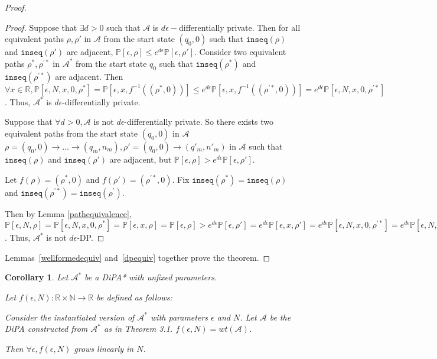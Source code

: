 \documentclass[12pt]{article}
\newcommand{\NN}{\mathbb{N}}
\newcommand{\RR}{\mathbb{R}}
\newcommand{\PP}{\mathbb{P}}
\newtheorem{cor}[thm]{Corollary}
\theoremstyle{definition}
\begin{document}
\begin{proof}
\begin{proof}
	Suppose that $\exists d > 0$ such that $\mathcal{A}$ is $d\epsilon-$differentially private. Then for all equivalent paths $\rho, \rho'$ in $\mathcal{A}$ from the start state $(q_0, 0)$ such that $\texttt{inseq}(\rho)$ and $\texttt{inseq}(\rho')$ are adjacent, $\PP[\epsilon, \rho] \leq e^{d\epsilon} \PP[\epsilon, \rho']$.
	Consider two equivalent paths $\rho^*, \rho^{\prime *}$ in $\mathcal{A}^*$ from the start state $q_0$ such that $\texttt{inseq}(\rho^*)$ and $\texttt{inseq}(\rho^{\prime *})$ are adjacent. Then $\forall x\in \RR, \PP[\epsilon, N, x, 0, \rho^*] = \PP[\epsilon, x, f^{-1}((\rho^*, 0))] \leq e^{d\epsilon}\PP[\epsilon, x, f^{-1}((\rho^{\prime *}, 0))] = e^{d\epsilon}\PP[\epsilon, N, x, 0, \rho^{\prime *}]$. Thus, $\mathcal{A}^*$ is $d\epsilon$-differentially private.

	Suppose that $\forall d>0, \mathcal{A}$ is not $d\epsilon$-differentially private. So there exists two equivalent paths from the start state $(q_0, 0)$ in $\mathcal{A}$ $\rho = (q_0, 0)\to\ldots\to (q_m, n_m), \rho' = (q_0, 0) \to (q'_m, n'_m)$ in $\mathcal{A}$ such that $\texttt{inseq}(\rho)$ and $\texttt{inseq}(\rho')$ are adjacent, but $\PP[\epsilon, \rho] > e^{d\epsilon}\PP[\epsilon, \rho']$. 
	
	Let $f(\rho) = (\rho^*, 0)$ and $f(\rho') = (\rho^{\prime *}, 0)$. Fix $\texttt{inseq}(\rho^*) = \texttt{inseq}(\rho)$ and $\texttt{inseq}(\rho^{\prime *})=\texttt{inseq}(\rho^{\prime})$.

	Then by Lemma \ref{pathequivalence}, $\PP[\epsilon, N, \rho]=\PP[\epsilon, N, x, 0, \rho^*] = \PP[\epsilon, x, \rho] = \PP[\epsilon, \rho] > e^{d\epsilon}\PP[\epsilon, \rho'] = e^{d\epsilon}\PP[\epsilon, x, \rho'] = e^{d\epsilon}\PP[\epsilon, N, x, 0, \rho^{\prime *}]= e^{d\epsilon}\PP[\epsilon, N, \rho^{\prime *}]$. Thus, $\mathcal{A}^*$ is not $d\epsilon$-DP.
\end{proof}

Lemmas~\ref{wellformedequiv} and~\ref{dpequiv} together prove the theorem. 
\end{proof}

\begin{cor}	

	Let $\mathcal{A}^*$ be a DiPA* with unfixed parameters.

	Let $f(\epsilon, N):\RR\times \NN \to \RR$ be defined as follows:

	Consider the instantiated version of $\mathcal{A}^*$ with parameters $\epsilon$ and $N$. Let $\mathcal{A}$ be the DiPA constructed from $\mathcal{A}^*$ as in Theorem 3.1. $f(\epsilon, N) = wt(\mathcal{A})$.


	Then $\forall \epsilon, f(\epsilon, N)$ grows linearly in $N$.
\end{cor}
\end{document}
